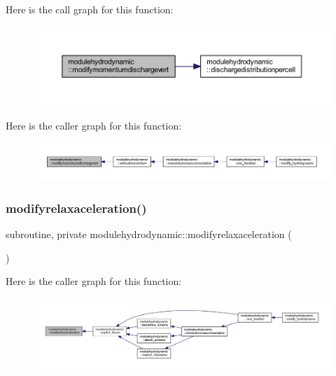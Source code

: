 Here is the call graph for this function\+:\nopagebreak
\begin{figure}[H]
\begin{center}
\leavevmode
\includegraphics[width=350pt]{namespacemodulehydrodynamic_a3f760d4a01b6aa649a0bc54d3b96ff54_cgraph}
\end{center}
\end{figure}
Here is the caller graph for this function\+:\nopagebreak
\begin{figure}[H]
\begin{center}
\leavevmode
\includegraphics[width=350pt]{namespacemodulehydrodynamic_a3f760d4a01b6aa649a0bc54d3b96ff54_icgraph}
\end{center}
\end{figure}
\mbox{\label{namespacemodulehydrodynamic_a2f55960a6b2fdca49570785ed31a7b97}} 
\subsubsection{\texorpdfstring{modifyrelaxaceleration()}{modifyrelaxaceleration()}}
{\footnotesize\ttfamily subroutine, private modulehydrodynamic\+::modifyrelaxaceleration (\begin{DoxyParamCaption}{ }\end{DoxyParamCaption})\hspace{0.3cm}{\ttfamily [private]}}

Here is the caller graph for this function\+:\nopagebreak
\begin{figure}[H]
\begin{center}
\leavevmode
\includegraphics[width=350pt]{namespacemodulehydrodynamic_a2f55960a6b2fdca49570785ed31a7b97_icgraph}
\end{center}
\end{figure}
\mbox{\label{namespacemodulehydrodynamic_aabfea672c59bdb0df6fb5e5dc5a72b20}} 
